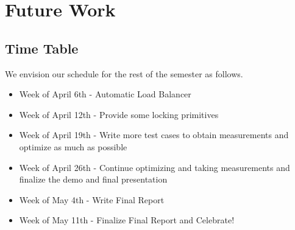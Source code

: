 \documentclass[11pt]{article}
\begin{document}
\section{Future Work}

\subsection{Time Table}

We envision our schedule for the rest of the semester as follows.

\begin{itemize}
\item Week of April 6th - Automatic Load Balancer 
\item Week of April 12th - Provide some locking primitives
\item Week of April 19th - Write more test cases to obtain measurements and optimize as much as possible
\item Week of April 26th - Continue optimizing and taking measurements and finalize the demo and final presentation
\item Week of May 4th - Write Final Report
\item Week of May 11th - Finalize Final Report and Celebrate!


\end{itemize}
\end{document}
